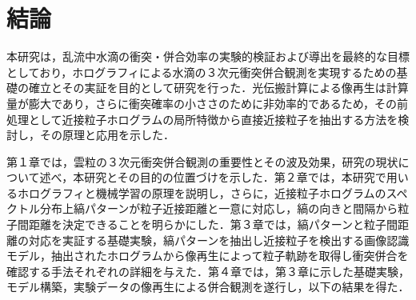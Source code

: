 \section{結論}
本研究は，乱流中水滴の衝突・併合効率の実験的検証および導出を最終的な目標としており，ホログラフィによる水滴の３次元衝突併合観測を実現するための基礎の確立とその実証を目的として研究を行った．光伝搬計算による像再生は計算量が膨大であり，さらに衝突確率の小ささのために非効率的であるため，その前処理として近接粒子ホログラムの局所特徴から直接近接粒子を抽出する方法を検討し，その原理と応用を示した．

第１章では，雲粒の３次元衝突併合観測の重要性とその波及効果，研究の現状について述べ，本研究とその目的の位置づけを示した．第２章では，本研究で用いるホログラフィと機械学習の原理を説明し，さらに，近接粒子ホログラムのスペクトル分布上縞パターンが粒子近接距離と一意に対応し，縞の向きと間隔から粒子間距離を決定できることを明らかにした．第３章では，縞パターンと粒子間距離の対応を実証する基礎実験，縞パターンを抽出し近接粒子を検出する画像認識モデル，抽出されたホログラムから像再生によって粒子軌跡を取得し衝突併合を確認する手法それぞれの詳細を与えた．第４章では，第３章に示した基礎実験，モデル構築，実験データの像再生による併合観測を遂行し，以下の結果を得た．

